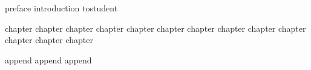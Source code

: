 \documentclass{claynote}
\begin{document}
\begin{void}
{

    \begin{pre}
        {preface}
        {introduction}
        {tostudent}
    \end{pre}

    \begin{body}
        {chapter}
        {chapter}
        {chapter}
        {chapter}
        {chapter}
        {chapter}
        {chapter}
        {chapter}
        {chapter}
        {chapter}
        {chapter}
        {chapter}
        {chapter}
    \end{body}

    \begin{append}
        {append}
        {append}
        {append}
    \end{append}
}
\end{void}
\end{document}
